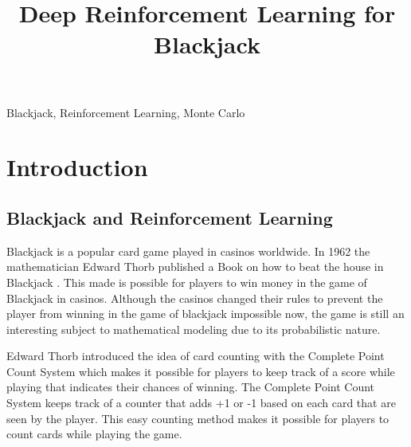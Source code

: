 \documentclass[conference]{IEEEtran}
\begin{document}
\title{Deep Reinforcement Learning for Blackjack}

\author{
}
\maketitle



\begin{abstract}
\end{abstract}

\begin{IEEEkeywords}
	Blackjack, Reinforcement Learning, Monte Carlo
\end{IEEEkeywords}

\section{Introduction}
\subsection{Blackjack and Reinforcement Learning} 
Blackjack is a popular card game played in casinos worldwide. 
In 1962 the mathematician Edward Thorb published a Book on how to beat the house in Blackjack \cite{b1}. 
This made is possible for players to win money in the game of Blackjack in casinos. 
Although the casinos changed their rules to prevent the player from winning in the game of blackjack impossible now, the game is still an interesting subject to mathematical modeling due to its probabilistic nature.    

Edward Thorb introduced the idea of card counting with the Complete Point Count System \cite{b1} which makes it possible for players to keep track of a score while playing that indicates their chances of winning.
The Complete Point Count System keeps track of a counter that adds +1 or -1 based on each card that are seen by the player. 
This easy counting method makes it possible for players to count cards while playing the game. 
\end{document}
